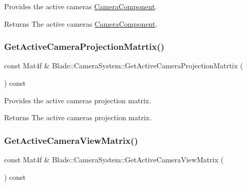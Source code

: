 Provides the active camera\textquotesingle{}s \hyperlink{class_blade_1_1_camera_component}{Camera\+Component}. 

\begin{DoxyReturn}{Returns}
The active camera\textquotesingle{}s \hyperlink{class_blade_1_1_camera_component}{Camera\+Component}. 
\end{DoxyReturn}
\mbox{\label{class_blade_1_1_camera_system_ab70602bec3fdc6fbfe26d90a789d40bc}} 
\subsubsection{\texorpdfstring{Get\+Active\+Camera\+Projection\+Matrtix()}{GetActiveCameraProjectionMatrtix()}}
{\footnotesize\ttfamily const Mat4f \& Blade\+::\+Camera\+System\+::\+Get\+Active\+Camera\+Projection\+Matrtix (\begin{DoxyParamCaption}{ }\end{DoxyParamCaption}) const\hspace{0.3cm}{\ttfamily [noexcept]}}



Provides the active camera\textquotesingle{}s projection matrix. 

\begin{DoxyReturn}{Returns}
The active camera\textquotesingle{}s projection matrix. 
\end{DoxyReturn}
\mbox{\label{class_blade_1_1_camera_system_a37ed2fa73706463322331377c6eb8a7f}} 
\subsubsection{\texorpdfstring{Get\+Active\+Camera\+View\+Matrix()}{GetActiveCameraViewMatrix()}}
{\footnotesize\ttfamily const Mat4f \& Blade\+::\+Camera\+System\+::\+Get\+Active\+Camera\+View\+Matrix (\begin{DoxyParamCaption}{ }\end{DoxyParamCaption}) const\hspace{0.3cm}{\ttfamily [noexcept]}}



